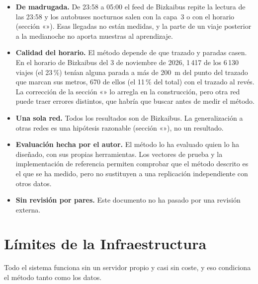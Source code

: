 \begin{itemize}
  \item \textbf{De madrugada.} De 23:58 a 05:00 el feed de Bizkaibus repite la lectura de las 23:58 y los autobuses
        nocturnos salen con la capa~3 o con el horario (sección «»). Esas llegadas no están
        medidas, y la parte de un viaje posterior a la medianoche no aporta muestras al aprendizaje.
  \item \textbf{Calidad del horario.} El método depende de que trazado y paradas casen. En el horario de Bizkaibus del
        3 de noviembre de 2026, 1\,417 de los 6\,130 viajes (el 23\,\%) tenían alguna parada a más de 200~m del
        punto del trazado que marcan sus metros, 670 de ellos (el 11\,\% del total) con el trazado al revés. La
        corrección de la sección «» lo arregla en la construcción, pero otra red puede
        traer errores distintos, que habría que buscar antes de medir el método.
  \item \textbf{Una sola red.} Todos los resultados son de Bizkaibus. La generalización a otras redes es una hipótesis
        razonable (sección «»), no un resultado.
  \item \textbf{Evaluación hecha por el autor.} El método lo ha evaluado quien lo ha diseñado, con sus propias
        herramientas. Los vectores de prueba y la implementación de referencia permiten comprobar que el método descrito
        es el que se ha medido, pero no sustituyen a una replicación independiente con otros datos.
  \item \textbf{Sin revisión por pares.} Este documento no ha pasado por una revisión externa.
\end{itemize}

\section{Límites de la Infraestructura}
\label{sec:infraestructura}

Todo el sistema funciona sin un servidor propio y casi sin coste, y eso condiciona el método tanto como los datos.

